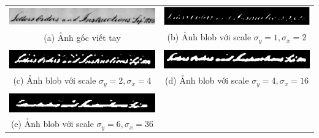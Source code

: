 \documentclass[a4paper]{article}
\begin{document}
\begin{table}[ht]
\centering
\begin{tabular}{cc}
\includegraphics[scale=0.35]{imgs/a_line_img.png} & \includegraphics[scale=0.35]{imgs/bloby1x2.png} \\
(a) Ảnh gốc viết tay & (b) Ảnh blob với scale $\sigma_y = 1, \sigma_x = 2$ \\\\
\includegraphics[scale=0.35]{imgs/bloby2x4.png} & \includegraphics[scale=0.35]{imgs/bloby4x16.png} \\
(c) Ảnh blob với scale $\sigma_y = 2, \sigma_x = 4$ & (d) Ảnh blob với scale $\sigma_y = 4, \sigma_x = 16$\\\\
\includegraphics[scale=0.35]{imgs/bloby6x36.png}\\
(e) Ảnh blob với scale $\sigma_y = 6, \sigma_x = 36$
\end{tabular}
\label{fig:fig2}
\end{table}

\end{document}
